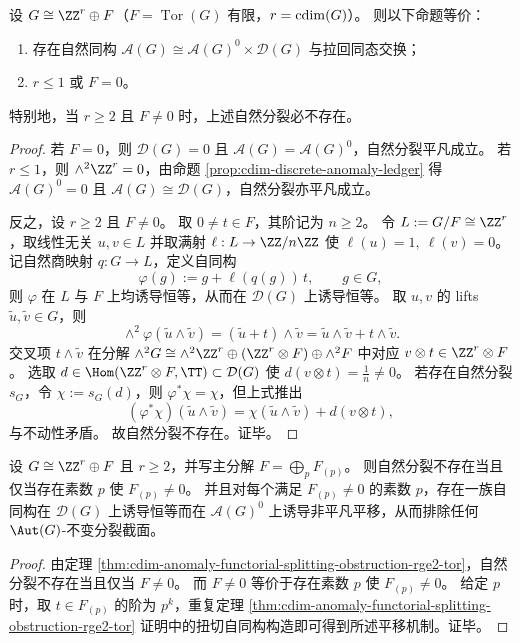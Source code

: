 \begin{theorem}[分裂失败的结构条件]\label{thm:cdim-anomaly-functorial-splitting-obstruction-rge2-tor}
设 \(G\cong \ZZ^r\oplus F\)（\(F=\operatorname{Tor}(G)\) 有限，\(r=\operatorname{cdim}(G)\)）。
则以下命题等价：
\begin{enumerate}
  \item 存在自然同构 \(\mathcal A(G)\cong \mathcal A(G)^0\times \mathcal D(G)\) 与拉回同态交换；
  \item \(r\le 1\) 或 \(F=0\)。
\end{enumerate}
特别地，当 \(r\ge 2\) 且 \(F\neq 0\) 时，上述自然分裂必不存在。
\end{theorem}
\begin{proof}
若 \(F=0\)，则 \(\mathcal D(G)=0\) 且 \(\mathcal A(G)=\mathcal A(G)^0\)，自然分裂平凡成立。
若 \(r\le 1\)，则 \(\wedge^2\ZZ^r=0\)，由命题 \ref{prop:cdim-discrete-anomaly-ledger} 得 \(\mathcal A(G)^0=0\) 且 \(\mathcal A(G)\cong\mathcal D(G)\)，自然分裂亦平凡成立。

反之，设 \(r\ge 2\) 且 \(F\neq 0\)。
取 \(0\neq t\in F\)，其阶记为 \(n\ge 2\)。
令 \(L:=G/F\cong \ZZ^r\)，取线性无关 \(u,v\in L\) 并取满射 \(\ell:L\to \ZZ/n\ZZ\) 使 \(\ell(u)=1,\ \ell(v)=0\)。
记自然商映射 \(q:G\to L\)，定义自同构
\[
\varphi(g):=g+\ell(q(g))\,t,\qquad g\in G,
\]
则 \(\varphi\) 在 \(L\) 与 \(F\) 上均诱导恒等，从而在 \(\mathcal D(G)\) 上诱导恒等。
取 \(u,v\) 的 lifts \(\tilde u,\tilde v\in G\)，则
\[
\wedge^2\varphi(\tilde u\wedge \tilde v)
=(\tilde u+t)\wedge \tilde v
=\tilde u\wedge \tilde v+t\wedge \tilde v.
\]
交叉项 \(t\wedge \tilde v\) 在分解 \(\wedge^2G\cong \wedge^2\ZZ^r\oplus(\ZZ^r\otimes F)\oplus\wedge^2F\) 中对应 \(v\otimes t\in \ZZ^r\otimes F\)。
选取 \(d\in \Hom(\ZZ^r\otimes F,\TT)\subset \mathcal D(G)\) 使 \(d(v\otimes t)=\tfrac1n\neq 0\)。
若存在自然分裂 \(s_G\)，令 \(\chi:=s_G(d)\)，则 \(\varphi^\ast\chi=\chi\)，但上式推出
\[
(\varphi^\ast\chi)(\tilde u\wedge \tilde v)
=\chi(\tilde u\wedge \tilde v)+d(v\otimes t),
\]
与不动性矛盾。
故自然分裂不存在。证毕。
\end{proof}

\begin{corollary}[障碍的素数支撑刻画]\label{cor:cdim-anomaly-splitting-prime-support}
设 \(G\cong \ZZ^r\oplus F\) 且 \(r\ge 2\)，并写主分解 \(F=\bigoplus_{p}F_{(p)}\)。
则自然分裂不存在当且仅当存在素数 \(p\) 使 \(F_{(p)}\neq 0\)。
并且对每个满足 \(F_{(p)}\neq 0\) 的素数 \(p\)，存在一族自同构在 \(\mathcal D(G)\) 上诱导恒等而在 \(\mathcal A(G)^0\) 上诱导非平凡平移，从而排除任何 \(\Aut(G)\)-不变分裂截面。
\end{corollary}
\begin{proof}
由定理 \ref{thm:cdim-anomaly-functorial-splitting-obstruction-rge2-tor}，自然分裂不存在当且仅当 \(F\neq 0\)。
而 \(F\neq 0\) 等价于存在素数 \(p\) 使 \(F_{(p)}\neq 0\)。
给定 \(p\) 时，取 \(t\in F_{(p)}\) 的阶为 \(p^k\)，重复定理 \ref{thm:cdim-anomaly-functorial-splitting-obstruction-rge2-tor} 证明中的扭切自同构构造即可得到所述平移机制。证毕。
\end{proof}

